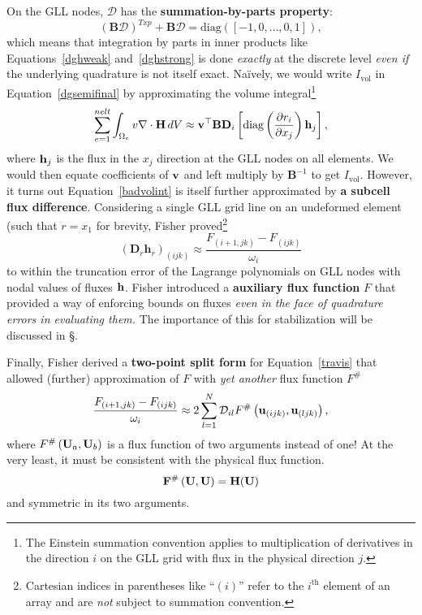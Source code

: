 On the GLL nodes, $\mathcal{D}$ has the \textbf{summation-by-parts property}:
\begin{equation}
\left(\mathbf{B}\mathcal{D}\right)^{Txp}+\mathbf{B}\mathcal{D}=\mbox{diag}\left(\left[-1,0,\dots,0,1\right]\right),
\label{SBP}
\end{equation}
which means that integration by parts in inner products like Equations~\ref{dghweak} and~\ref{dghstrong}
is done \emph{exactly} at the discrete level \emph{even if} 
the underlying quadrature is not itself exact.
Na{\"i}vely, we would write $I_{\mbox{vol}}$ in Equation~\ref{dgsemifinal} by
approximating the volume integral\footnote{The Einstein summation convention
applies to multiplication of derivatives in the direction $i$ on the GLL grid with flux in the
physical direction $j$.}
\begin{equation}
\sum_{e=1}^{nelt}\int_{\Omega_e} v \nabla \cdot {\bf H}\, dV \approx
{\bf v}^{\top}\mathbf{B}\mathbf{D}_i\left[\mbox{diag}\left(\frac{\partial r_i}{\partial x_j}\right){\bf h}_j\right],
\label{badvolint}
\end{equation}
where ${\bf h}_j$ is the flux in the $x_j$ direction at the GLL nodes on all elements. We would then equate coefficients of ${\bf v}$ and left multiply by
$\mathbf{B}^{-1}$ to get $I_{\mbox{vol}}$. However, it turns out\cite{CarpenterESSC} Equation~\ref{badvolint}
is itself further approximated by \textbf{a subcell flux difference}. Considering
a single GLL grid line on an undeformed element (such that $r=x_1$ for brevity, Fisher\cite{FisherJCP252}
proved\footnote{Cartesian indices in parentheses like ``$(i)$'' refer to the
$i^{\mbox{th}}$ element of an array and are \emph{not} subject to summation
convention.}
\begin{equation}
\left(\mathbf{D}_r\mathbf{h}_r\right)_{(ijk)}\approx
\frac{F_{(i+1,jk)}-F_{(ijk)}}{\omega_i}
\label{travis}
\end{equation}
to within the truncation error of the Lagrange polynomials on GLL nodes
with nodal values of fluxes ${\bf h}$. Fisher introduced a \textbf{auxiliary flux function} $F$
that provided a way of enforcing bounds on fluxes \emph{even in the face of
quadrature errors in evaluating them.} The importance of this for stabilization
will be discussed in \S.

Finally, Fisher derived a \textbf{two-point split form} for Equation~\ref{travis}
that allowed (further) approximation of $F$ with \emph{yet another} flux function $F^{\#}$
\begin{equation}
\frac{F_{(i+1,jk)}-F_{(ijk)}}{\omega_i}\approx 2
\sum_{l=1}^N\mathcal{D}_{il}F^{\#}\left({\bf u}_{(ijk)},{\bf u}_{(ljk)}\right),
\label{finally2pt}
\end{equation}
where $F^{\#}\left({\bf U}_a,{\bf U}_b\right)$ is a flux function of two arguments instead of one!
At the very least, it must be consistent with the physical flux function.
\begin{equation}
{\bf F}^{\#}\left({\bf U},{\bf U}\right)={\bf H}({\bf U})
\label{consistency}
\end{equation}
and symmetric in its two arguments.

